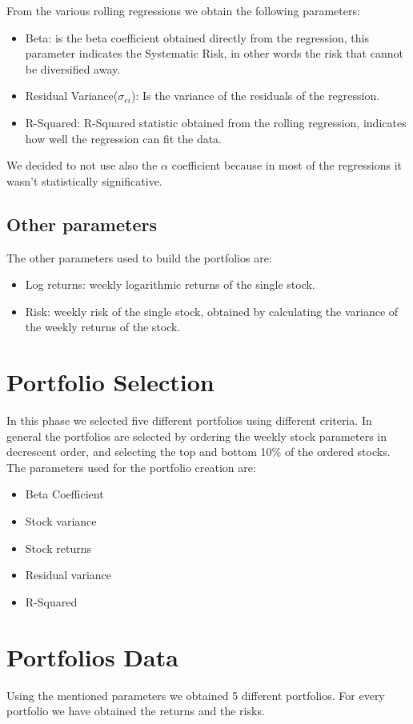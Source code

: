 \documentclass[12pt, a4paper, twocolumn]{article} %
\begin{document}
	From the various rolling regressions we obtain the following parameters:
	\begin{itemize}
		\item Beta: is the beta coefficient obtained directly from the regression, this parameter indicates the Systematic Risk, in other words the risk that cannot be diversified away.
		\item Residual Variance($\sigma_{ei}$): Is the variance of the residuals of the regression.
		\item R-Squared: R-Squared statistic obtained from the rolling regression, indicates how well the regression can fit the data.
	\end{itemize}
	We decided to not use also the $\alpha$ coefficient because in most of the regressions it wasn't statistically significative.
	\subsection{Other parameters}
	The other parameters used to build the portfolios are:
	\begin{itemize}
		\item Log returns: weekly logarithmic returns of the single stock.
		\item Risk: weekly risk of the single stock, obtained by calculating the variance of the weekly returns of the stock.
	\end{itemize}
	
	\section{Portfolio Selection}
	In this phase we selected five different portfolios using different criteria. In general the portfolios are selected by ordering the weekly stock parameters in decrescent order, and selecting the top and bottom 10\% of the ordered stocks.
	The parameters used for the portfolio creation are:
	\begin{itemize}
		\item Beta Coefficient
		\item Stock variance
		\item Stock returns
		\item Residual variance
		\item R-Squared
	\end{itemize}
	\section{Portfolios Data}
	Using the mentioned parameters we obtained 5 different portfolios. For every portfolio we have obtained the returns and the risks.
\end{document}

